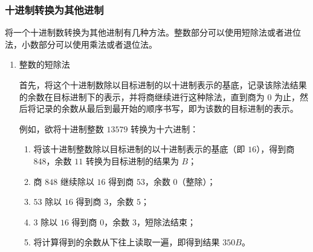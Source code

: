         \subsubsection{十进制转换为其他进制}\label{subsubsec:ArithBasics/positional-notation-presentation-and-conversion/conversion/from-decimal}
            将一个十进制数转换为其他进制有几种方法。整数部分可以使用短除法或者进位法，小数部分可以使用乘法或者退位法。
            \begin{enumerate}
                \item 整数的短除法

                    首先，将这个十进制数除以目标进制的以十进制表示的基底，记录该除法结果的余数在目标进制下的表示，并将商继续进行这种除法，直到商为 0 为止，然后将记录的余数从最后到最开始的顺序书写，即为该数的目标进制的表示。

                    例如，欲将十进制整数 $13579$ 转换为十六进制：

                    \begin{enumerate}
                        \item 将该十进制整数除以目标进制的以十进制表示的基底（即 $16$），得到商 $848$，余数 $11$ 转换为目标进制的结果为 $B$；
                        \item 商 $848$ 继续除以 $16$ 得到商 $53$，余数 $0$（整除）；
                        \item $53$ 除以 $16$ 得到商 $3$，余数 $5$；
                        \item $3$ 除以 $16$ 得到商 $0$，余数 $3$，短除法结束；
                        \item 将计算得到的余数从下往上读取一遍，即得到结果 $350B$。
                    \end{enumerate}


\end{enumerate}
